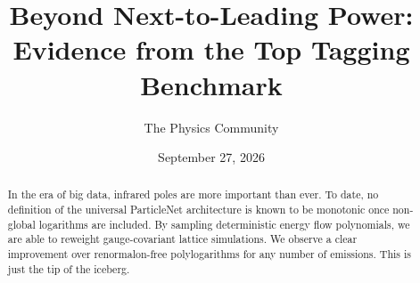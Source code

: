 \documentclass[11pt]{article}
\title{Beyond Next-to-Leading Power: Evidence from the Top Tagging Benchmark}
\author{The Physics Community}
\date{September 27, 2026}
\numberwithin{equation}{section}
\theoremstyle{definition}
\theoremstyle{remark}
\begin{document}
\maketitle
\begin{abstract}
In the era of big data, infrared poles are more important than ever. To
date, no definition of the universal ParticleNet architecture is known
to be monotonic once non-global logarithms are included. By sampling
deterministic energy flow polynomials, we are able to reweight
gauge-covariant lattice simulations. We observe a clear improvement over
renormalon-free polylogarithms for any number of emissions. This is just
the tip of the iceberg.
\end{abstract}
\tableofcontents





\nocite{*}


\end{document}
